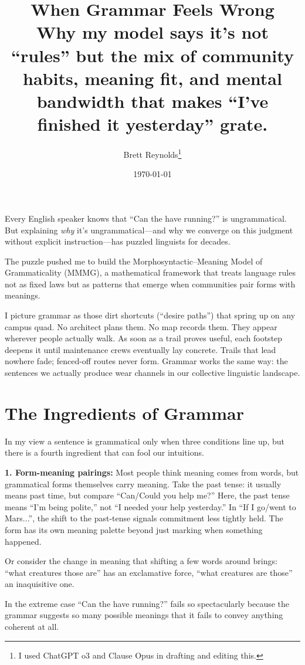 \documentclass[12pt]{article}
\title{When Grammar Feels Wrong\\[0.5em]
\large Why my model says it’s not \enquote{rules} but the mix of community habits, meaning fit, and mental bandwidth that makes “I’ve finished it yesterday” grate.}
\author{Brett Reynolds\footnote{I used ChatGPT o3 and Clause Opus in drafting and editing this.}}
\date{\today}
\begin{document}
\maketitle

\noindent Every English speaker knows that \enquote{Can the have running?} is ungrammatical. But explaining \emph{why} it's ungrammatical—and why we converge on this judgment without explicit instruction—has puzzled linguists for decades.

The puzzle pushed me to build the Morphosyntactic–Meaning Model of Grammaticality (MMMG), a mathematical framework that treats language rules not as fixed laws but as patterns that emerge when communities pair forms with meanings.

I picture grammar as those dirt shortcuts (\enquote{desire paths}) that spring up on any campus quad. No architect plans them. No map records them. They appear wherever people actually walk. As soon as a trail proves useful, each footstep deepens it until maintenance crews eventually lay concrete. Trails that lead nowhere fade; fenced-off routes never form. Grammar works the same way: the sentences we actually produce wear channels in our collective linguistic landscape.

\section*{The Ingredients of Grammar}

In my view a sentence is grammatical only when three conditions line up, but there is a fourth ingredient that can fool our intuitions.

\textbf{1. Form-meaning pairings:} Most people think meaning comes from words, but grammatical forms themselves carry meaning. Take the past tense: it usually means past time, but compare \enquote{Can/Could you help me?} Here, the past tense means \enquote{I'm being polite,} not \enquote{I needed your help yesterday.} In \enquote{If I go/went to Mars...}, the shift to the past-tense signals commitment less tightly held. The form has its own meaning palette beyond just marking when something happened.

Or consider the change in meaning that shifting a few words around brings: \enquote{what creatures those are} has an exclamative force, \enquote{what creatures are those} an inaquisitive one.

In the extreme case \enquote{Can the have running?} fails so spectacularly because the grammar suggests so many possible meanings that it fails to convey anything coherent at all.
\end{document}
